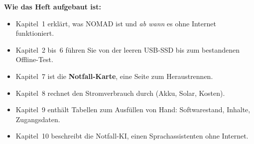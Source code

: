 \textbf{Wie das Heft aufgebaut ist:}
\begin{itemize}[leftmargin=1.2em,itemsep=2pt]
\item Kapitel~1 erklärt, was NOMAD ist und \emph{ab wann} es ohne Internet funktioniert.
\item Kapitel~2 bis~6 führen Sie von der leeren USB-SSD bis zum bestandenen Offline-Test.
\item Kapitel~7 ist die \textbf{Notfall-Karte}, eine Seite zum Heraustrennen.
\item Kapitel~8 rechnet den Stromverbrauch durch (Akku, Solar, Kosten).
\item Kapitel~9 enthält Tabellen zum Ausfüllen von Hand: Softwarestand, Inhalte, Zugangsdaten.
\item Kapitel~10 beschreibt die Notfall-KI, einen Sprachassistenten ohne Internet.
\end{itemize}


